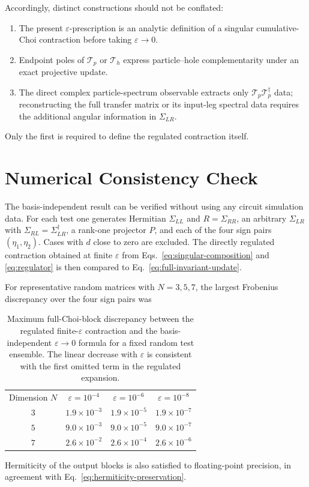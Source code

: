 \documentclass[aps,prb,onecolumn,nofootinbib,superscriptaddress]{revtex4-2}
\newcommand{\eps}{\varepsilon}
\theoremstyle{plain}
\theoremstyle{definition}
\begin{document}
Accordingly, distinct constructions should not be conflated:
\begin{enumerate}
  \item The present \(\eps\)-prescription is an analytic definition of a
  singular cumulative-Choi contraction before taking \(\eps\to0\).
  \item Endpoint poles of \(\mathcal T_p\) or \(\mathcal T_h\) express
  particle--hole complementarity under an exact projective update.
  \item The direct complex particle-spectrum observable extracts only
  \(\mathcal T_p\mathcal T_p^\dagger\) data; reconstructing the full
  transfer matrix or its input-leg spectral data requires the additional
  angular information in \(\Sigma_{LR}\).
\end{enumerate}
Only the first is required to define the regulated contraction itself.

\section{Numerical Consistency Check}

The basis-independent result can be verified without using any circuit
simulation data.  For each test one generates Hermitian
\(\Sigma_{LL}\) and \(R=\Sigma_{RR}\), an arbitrary \(\Sigma_{LR}\) with
\(\Sigma_{RL}=\Sigma_{LR}^\dagger\), a rank-one projector \(P\), and each
of the four sign pairs \((\eta_1,\eta_2)\).  Cases with \(d\) close to zero
are excluded.  The directly regulated contraction obtained at finite
\(\eps\) from Eqs.~\eqref{eq:singular-composition} and
\eqref{eq:regulator} is then compared to
Eq.~\eqref{eq:full-invariant-update}.

For representative random matrices with \(N=3,5,7\), the largest Frobenius
discrepancy over the four sign pairs was
\begin{table}[h]
  \caption{\label{tab:numerical-check}
  Maximum full-Choi-block discrepancy between the regulated finite-\(\eps\)
  contraction and the basis-independent \(\eps\to0\) formula for a fixed
  random test ensemble.  The linear decrease with \(\eps\) is consistent
  with the first omitted term in the regulated expansion.}
  \begin{ruledtabular}
  \begin{tabular}{cccc}
  Dimension \(N\) & \(\eps=10^{-4}\) & \(\eps=10^{-6}\) & \(\eps=10^{-8}\)\\
  \colrule
  \(3\) & \(1.9\times10^{-3}\) & \(1.9\times10^{-5}\) & \(1.9\times10^{-7}\)\\
  \(5\) & \(9.0\times10^{-3}\) & \(9.0\times10^{-5}\) & \(9.0\times10^{-7}\)\\
  \(7\) & \(2.6\times10^{-2}\) & \(2.6\times10^{-4}\) & \(2.6\times10^{-6}\)
  \end{tabular}
  \end{ruledtabular}
\end{table}
Hermiticity of the output blocks is also satisfied to floating-point
precision, in agreement with Eq.~\eqref{eq:hermiticity-preservation}.
\end{document}
